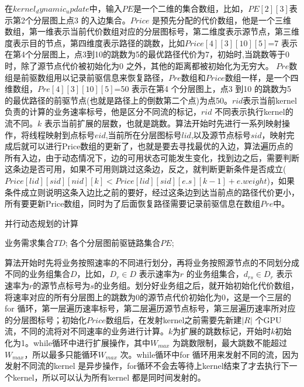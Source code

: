 在$kernel_dynamic_update$中，输入$PE$是一个二维的集合数组，比如，$PE[2][3]$表示第2个分层图上点3 的入边集合。$Price$ 是预先分配的代价数组，他是一个三维数组，第一维表示当前代价数组对应的分层图标号，第二维度表示源节点，第三维度表示目的节点，第四维度表示路径的跳数，比如$Price[4][3][10][5]$=7 表示在第4个分层图上，点3到10的跳数为5的最优路径代价为7，初始时,当跳数等于0 时，除了源节点代价被初始化为0 之外，其他的距离都被初始化为无穷大。
$Pre$数组是前驱数组用以记录前驱信息来恢复路径，$Pre$数组和$Price$数组一样，是一个四维数组，$Pre[4][3][10][5]$=50 表示在第4 个分层图上，点3 到10 的跳数为5的最优路径的前驱节点(也就是路径上的倒数第二个点)为点50。$rid$表示当前kernel 负责的计算的业务速率标号，他是区分不同流的标记，$rid$ 不同表示执行kernel的流不同。$k$ 表示当前扩展的层数，也就是跳数。算法开始时先进行一系列映射操作，将线程映射到点标号$eid$,当前所在分层图标号$lid$,以及源节点标号$sid$，映射完成后就可以进行Price数组的更新了，也就是要去寻找最优的入边，算法遍历点的所有入边，由于动态情况下，边的可用状态可能发生变化，找到边之后，需要判断这条边是否可用，如果不可用则跳过这条边，反之，就判断更新条件是否成立($Price[lid][sid][nid][k]<Price[lid][sid][e.s][k-1]+e.weight$)，如果条件成立则说明这条入边比之前的要好，经过这条边到达当前点的路径代价更小，所有要更新Price数组，同时为了后面恢复路径需要记录前驱信息在数组$Pre$中。
\begin{algorithm}[t]
\begin{algorithmic}[1]
\caption{{并行动态规划的计算}}
\label{ParaSPC}
\Require
	 业务需求集合$TD$;
      各个分层图前驱链路集合$PE$;
\Else
{}
\EndIf
{}
\EndFor
\EndFor
\EndFor
\EndFor
{}
\EndFor
{}
\EndWhile
{}
\end{algorithmic}
\end{algorithm}

算法开始时先将业务按照速率的不同进行划分，再将业务按照源节点的不同划分成不同的业务组集合$D$，比如，$D_r \in D$ 表示速率为$r$ 的业务组集合，$d_{rs} \in D_r$ 表示速率为$r$的源节点标号为$s$的业务组。划分好业务组之后，就开始初始化代价数组，将速率对应的所有分层图上的跳数为0的源节点代价初始化为0，这是一个三层的for 循环，第一层遍历速率标号，第二层遍历源节点标号，第三层遍历速率所对应的分层图标号；初始化$Price$数组后，在发射kernel之前需要先新建$|R|$ 个GPU 流，不同的流将对不同速率的业务进行计算。$k$为扩展的跳数标记，开始时$k$初始化为1。while循环中进行扩展操作，其中$W_{max}$ 为跳数限制，最大跳数不能超过$W_{max}$，所以最多只能循环$W_{max}$ 次。while循环中for 循环用来发射不同的流，因为发射不同流的kernel 是异步操作，for循环不会去等待上kernel结束了才去执行下一个kernel，所以可以认为所有kernel 都是同时间发射的。
